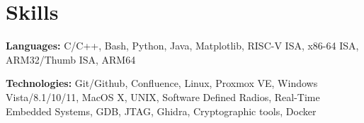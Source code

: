 \documentclass[letterpaper,11pt]{article}
\newcommand{\resumeSubHeadingListStart}{\begin{itemize}[leftmargin=0.15in, label={}]}
\newcommand{\resumeSubHeadingListEnd}{\end{itemize}}
\begin{document}




\section{Skills}
  \vspace{2pt}
  \resumeSubHeadingListStart
    \small{\item{

        \textbf{Languages:}{ C/C++, Bash, Python, 
        Java, Matplotlib, %
        RISC-V ISA, x86-64 ISA, ARM32/Thumb ISA, ARM64} \\ \vspace{3pt}%


        \textbf{Technologies:}{ Git/Github, Confluence, Linux, Proxmox VE, Windows Vista/8.1/10/11, MacOS X, UNIX, Software Defined Radios,  
                                Real-Time Embedded Systems, GDB, JTAG, Ghidra, Cryptographic tools, Docker} \\ \vspace{3pt}

    }}
  \resumeSubHeadingListEnd
\end{document}
